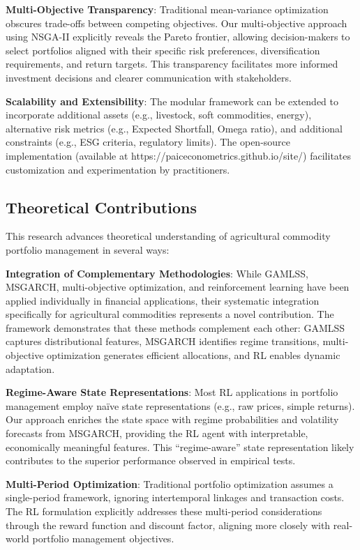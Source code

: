 \documentclass[
  10pt,
  a4paper,
]{article}
\begin{document}
\textbf{Multi-Objective Transparency}: Traditional mean-variance
optimization obscures trade-offs between competing objectives. Our
multi-objective approach using NSGA-II explicitly reveals the Pareto
frontier, allowing decision-makers to select portfolios aligned with
their specific risk preferences, diversification requirements, and
return targets. This transparency facilitates more informed investment
decisions and clearer communication with stakeholders.

\textbf{Scalability and Extensibility}: The modular framework can be
extended to incorporate additional assets (e.g., livestock, soft
commodities, energy), alternative risk metrics (e.g., Expected
Shortfall, Omega ratio), and additional constraints (e.g., ESG criteria,
regulatory limits). The open-source implementation (available at
https://paiceconometrics.github.io/site/) facilitates customization and
experimentation by practitioners.

\subsection{Theoretical Contributions}\label{sec-discussion-theoretical}

This research advances theoretical understanding of agricultural
commodity portfolio management in several ways:

\textbf{Integration of Complementary Methodologies}: While GAMLSS,
MSGARCH, multi-objective optimization, and reinforcement learning have
been applied individually in financial applications, their systematic
integration specifically for agricultural commodities represents a novel
contribution. The framework demonstrates that these methods complement
each other: GAMLSS captures distributional features, MSGARCH identifies
regime transitions, multi-objective optimization generates efficient
allocations, and RL enables dynamic adaptation.

\textbf{Regime-Aware State Representations}: Most RL applications in
portfolio management employ naïve state representations (e.g., raw
prices, simple returns). Our approach enriches the state space with
regime probabilities and volatility forecasts from MSGARCH, providing
the RL agent with interpretable, economically meaningful features. This
``regime-aware'' state representation likely contributes to the superior
performance observed in empirical tests.

\textbf{Multi-Period Optimization}: Traditional portfolio optimization
assumes a single-period framework, ignoring intertemporal linkages and
transaction costs. The RL formulation explicitly addresses these
multi-period considerations through the reward function and discount
factor, aligning more closely with real-world portfolio management
objectives.
\end{document}
